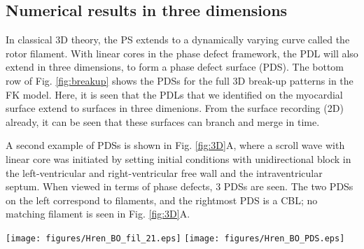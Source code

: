 \documentclass[aps,pre,amsfonts,amssymb,amsmath,twocolumn, superscriptaddress]{revtex4-1}
\newcommand{\phiact}{\ensuremath{\phi_{\rm act}}}
\newcommand{\phiarr}{\ensuremath{\phi_{\rm arr}}}
\newcommand{\figbreakup}{2.5cm}
\begin{document}
\begin{figure*}
    \caption{Analysis of a break-up pattern in a 3D slab geometry with linear-core rotors and rotational anistropy in the FK model. Panels A-C show activity at times t=30, 35 and 40\,ms, respectively. The rows show respectively 3D activity with filaments (colors indicate different filaments),  normalized transmembrane voltage on the bottom surface, and analysis of the surface patterns in terms of $\phiarr$ and $\phiact$ and 3D activity with filaments colored as above and PDSs indicated in grey. Note that several phase defects are observed, indicating conduction block near the spiral wave core.}
    \label{fig:breakup}
\end{figure*}

\subsection{Numerical results in three dimensions}

In classical 3D theory, the PS extends to a dynamically varying curve called the rotor filament. With linear cores in the phase defect framework, the PDL will also extend in three dimensions, to form a phase defect surface (PDS). The bottom row of Fig. \ref{fig:breakup} shows the PDSs for the full 3D break-up patterns in the FK model. Here, it is seen that the PDLs that we identified on the myocardial surface extend to surfaces in three dimenions. From the surface recording (2D) already, it can be seen that these surfaces can branch and merge in time. 

A second example of PDSs is shown in Fig. \ref{fig:3D}A, where a scroll wave with linear core was initiated by setting initial conditions with unidirectional block in the left-ventricular and right-ventricular free wall and the intraventricular septum. When viewed in terms of phase defects, 3 PDSs are seen. The two PDSs on the left correspond to filaments, and the rightmost PDS is a CBL; no matching filament is seen in Fig. \ref{fig:3D}A. 

\begin{figure*}[htp]
\centering
{} 
\texttt{[image: figures/Hren\_BO\_fil\_21.eps]}
\texttt{[image: figures/Hren\_BO\_PDS.eps]}
\caption{
Numerical simulation of rotors in the BOCF model in a biventricular human geometry. (A) Snapshot colored according to normalized transmembrane voltage, showing 2 classical rotor filaments in red. (B) Phase defect surfaces (PDSs) for the same snapshot. The two leftmost PDS bear a classical filament in them, the rightmost one (in the right-ventricular free wall) is a site of conduction block. 
\label{fig:3D} }
\end{figure*}
\end{document}
